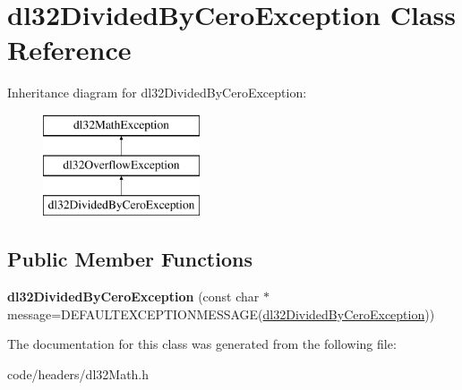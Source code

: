 \hypertarget{classdl32_divided_by_cero_exception}{\section{dl32\-Divided\-By\-Cero\-Exception Class Reference}
\label{classdl32_divided_by_cero_exception}
}
Inheritance diagram for dl32\-Divided\-By\-Cero\-Exception\-:\begin{figure}[H]
\begin{center}
\leavevmode
\includegraphics[height=3.000000cm]{classdl32_divided_by_cero_exception}
\end{center}
\end{figure}
\subsection*{Public Member Functions}
\begin{DoxyCompactItemize}
\item 
\hypertarget{classdl32_divided_by_cero_exception_a7a5d81bbd7d9cf1610b11e54490c2a10}{{\bfseries dl32\-Divided\-By\-Cero\-Exception} (const char $\ast$message=D\-E\-F\-A\-U\-L\-T\-E\-X\-C\-E\-P\-T\-I\-O\-N\-M\-E\-S\-S\-A\-G\-E(\hyperlink{classdl32_divided_by_cero_exception}{dl32\-Divided\-By\-Cero\-Exception}))}\label{classdl32_divided_by_cero_exception_a7a5d81bbd7d9cf1610b11e54490c2a10}

\end{DoxyCompactItemize}


The documentation for this class was generated from the following file\-:\begin{DoxyCompactItemize}
\item 
code/headers/dl32\-Math.\-h\end{DoxyCompactItemize}
